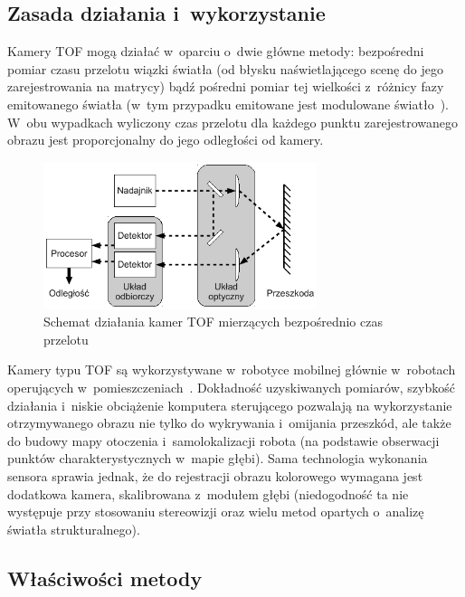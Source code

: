 \subsection{Zasada działania i~wykorzystanie}

Kamery TOF mogą działać w~oparciu o~dwie główne metody: bezpośredni pomiar
czasu przelotu wiązki światła (od błysku naświetlającego scenę do jego
zarejestrowania na matrycy) bądź pośredni pomiar tej wielkości z~różnicy fazy
emitowanego światła (w~tym przypadku emitowane jest modulowane
światło~\cite{910448}). W~obu wypadkach wyliczony czas przelotu dla każdego
punktu zarejestrowanego obrazu jest proporcjonalny do jego odległości od kamery.

\begin{figure}[h!]
\centering
\includegraphics[width=8cm]{../../Common/img/tof}
\caption{Schemat działania kamer TOF mierzących bezpośrednio czas przelotu}
\label{fig:tof}
\end{figure}

Kamery typu TOF są wykorzystywane w~robotyce mobilnej głównie w~robotach
operujących w~pomieszczeniach~\cite{Prusak:2008:PEM:1462089.1462102}. Dokładność
uzyskiwanych pomiarów, szybkość działania i~niskie obciążenie komputera
sterującego pozwalają na wykorzystanie otrzymywanego obrazu nie tylko do
wykrywania i~omijania przeszkód, ale także do budowy mapy otoczenia
i~samolokalizacji robota (na podstawie obserwacji punktów charakterystycznych
w~mapie głębi). Sama technologia wykonania sensora sprawia jednak, że do
rejestracji obrazu kolorowego wymagana jest dodatkowa kamera, skalibrowana
z~modułem głębi (niedogodność ta nie występuje przy stosowaniu stereowizji oraz
wielu metod opartych o~analizę światła strukturalnego).

\subsection{Właściwości metody}

